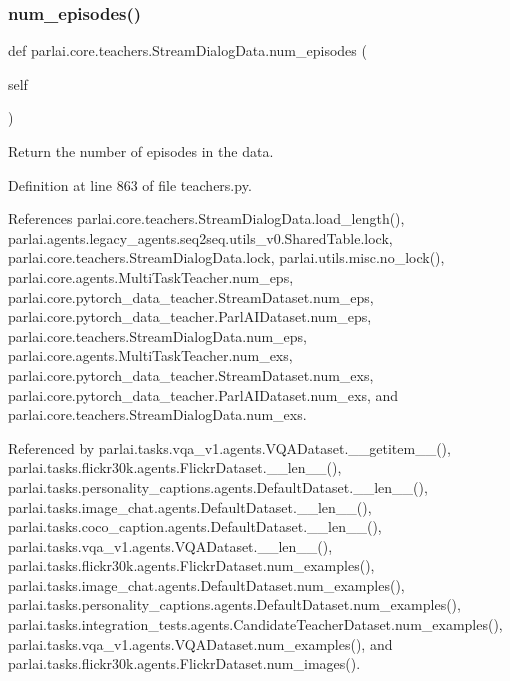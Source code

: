 \subsubsection{\texorpdfstring{num\+\_\+episodes()}{num\_episodes()}}
{\footnotesize\ttfamily def parlai.\+core.\+teachers.\+Stream\+Dialog\+Data.\+num\+\_\+episodes (\begin{DoxyParamCaption}\item[{}]{self }\end{DoxyParamCaption})}

\begin{DoxyVerb}Return the number of episodes in the data.\end{DoxyVerb}
 

Definition at line 863 of file teachers.\+py.



References parlai.\+core.\+teachers.\+Stream\+Dialog\+Data.\+load\+\_\+length(), parlai.\+agents.\+legacy\+\_\+agents.\+seq2seq.\+utils\+\_\+v0.\+Shared\+Table.\+lock, parlai.\+core.\+teachers.\+Stream\+Dialog\+Data.\+lock, parlai.\+utils.\+misc.\+no\+\_\+lock(), parlai.\+core.\+agents.\+Multi\+Task\+Teacher.\+num\+\_\+eps, parlai.\+core.\+pytorch\+\_\+data\+\_\+teacher.\+Stream\+Dataset.\+num\+\_\+eps, parlai.\+core.\+pytorch\+\_\+data\+\_\+teacher.\+Parl\+A\+I\+Dataset.\+num\+\_\+eps, parlai.\+core.\+teachers.\+Stream\+Dialog\+Data.\+num\+\_\+eps, parlai.\+core.\+agents.\+Multi\+Task\+Teacher.\+num\+\_\+exs, parlai.\+core.\+pytorch\+\_\+data\+\_\+teacher.\+Stream\+Dataset.\+num\+\_\+exs, parlai.\+core.\+pytorch\+\_\+data\+\_\+teacher.\+Parl\+A\+I\+Dataset.\+num\+\_\+exs, and parlai.\+core.\+teachers.\+Stream\+Dialog\+Data.\+num\+\_\+exs.



Referenced by parlai.\+tasks.\+vqa\+\_\+v1.\+agents.\+V\+Q\+A\+Dataset.\+\_\+\+\_\+getitem\+\_\+\+\_\+(), parlai.\+tasks.\+flickr30k.\+agents.\+Flickr\+Dataset.\+\_\+\+\_\+len\+\_\+\+\_\+(), parlai.\+tasks.\+personality\+\_\+captions.\+agents.\+Default\+Dataset.\+\_\+\+\_\+len\+\_\+\+\_\+(), parlai.\+tasks.\+image\+\_\+chat.\+agents.\+Default\+Dataset.\+\_\+\+\_\+len\+\_\+\+\_\+(), parlai.\+tasks.\+coco\+\_\+caption.\+agents.\+Default\+Dataset.\+\_\+\+\_\+len\+\_\+\+\_\+(), parlai.\+tasks.\+vqa\+\_\+v1.\+agents.\+V\+Q\+A\+Dataset.\+\_\+\+\_\+len\+\_\+\+\_\+(), parlai.\+tasks.\+flickr30k.\+agents.\+Flickr\+Dataset.\+num\+\_\+examples(), parlai.\+tasks.\+image\+\_\+chat.\+agents.\+Default\+Dataset.\+num\+\_\+examples(), parlai.\+tasks.\+personality\+\_\+captions.\+agents.\+Default\+Dataset.\+num\+\_\+examples(), parlai.\+tasks.\+integration\+\_\+tests.\+agents.\+Candidate\+Teacher\+Dataset.\+num\+\_\+examples(), parlai.\+tasks.\+vqa\+\_\+v1.\+agents.\+V\+Q\+A\+Dataset.\+num\+\_\+examples(), and parlai.\+tasks.\+flickr30k.\+agents.\+Flickr\+Dataset.\+num\+\_\+images().

